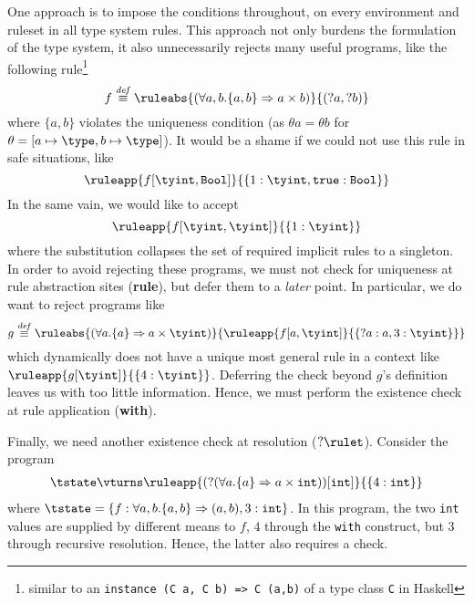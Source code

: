 One approach is to impose the conditions throughout, on every 
environment and ruleset in all type system rules. This approach not only burdens the
formulation of the type system, it also unnecessarily rejects many useful
programs, like the following rule\footnote{similar to 
an \texttt{instance (C a, C b) => C (a,b)} of a type class \texttt{C} in Haskell}
\begin{equation*}
f \stackrel{\mathit{def}}{\equiv}\ruleabs{(\forall a,b.\{a,b\} \Rightarrow a \times b)}{(?a,?b)}
\end{equation*}
where $\{a,b\}$ violates the uniqueness condition (as $\theta a = \theta b$ for $\theta = [a \mapsto \type, b \mapsto \type]$). It would be a shame if we could
not use this rule in safe situations, like
\begin{equation*}
\ruleapp{f[\tyint,\texttt{Bool}]}{\{1:\tyint,\texttt{true}:\texttt{Bool}\}}
\end{equation*}
In the same vain, we would like to accept
\begin{equation*}
\ruleapp{f[\tyint,\tyint]}{\{1:\tyint\}}
\end{equation*}
where the substitution collapses the set of required implicit rules to a
singleton.
In order to avoid rejecting these programs, we must not check for uniqueness
at rule abstraction sites (\textbf{rule}), but defer them to a \textit{later} point.
In particular, we do want to reject programs like
\begin{equation*}
g \stackrel{\mathit{def}}{\equiv}
\ruleabs{(\forall a.\{a\} \Rightarrow a \times \tyint)}
      {\ruleapp
        {f[a,\tyint]}
        {\{?a:a,3:\tyint\}}}
\end{equation*}
which dynamically does not have a unique most general rule in a context like 
$\ruleapp{ g[\tyint]}{\{ 4 : \tyint\}}$. Deferring the check beyond
$g$'s definition leaves us with too little information. Hence, we must perform
the existence check at rule application (\textbf{with}).

Finally, we need another existence check at resolution ($?\rulet$). Consider
the program
\[\begin{array}{l}
\tstate \vturns 
\ruleapp{(?(\forall a.\{a\}\Rightarrow a \times \texttt{int}))[\texttt{int}]}
  {\{4:\texttt{int}\}}
\end{array}\]
where $\tstate = \{f:\forall a,b.\{a,b\}\Rightarrow (a, b) ,3:\texttt{int}\}$.
In this program, the two \texttt{int} values are supplied by different means to $f$,
$4$ through the \texttt{with} construct, but $3$ through recursive resolution. Hence,
the latter also requires a check.

